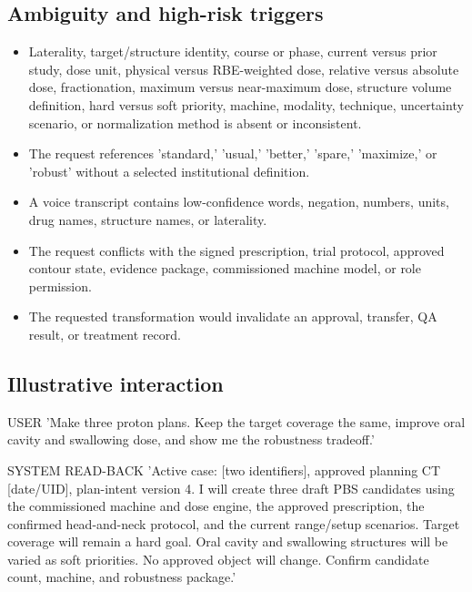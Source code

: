 \documentclass[11pt,letterpaper]{article}
\begin{document}
\subsection{Ambiguity and high-risk triggers}

\begin{itemize}
\item Laterality, target\slash\allowbreak{}structure identity, course or phase, current versus prior study, dose unit, physical versus RBE-weighted dose, relative versus absolute dose, fractionation, maximum versus near-maximum dose, structure volume definition, hard versus soft priority, machine, modality, technique, uncertainty scenario, or normalization method is absent or inconsistent.
\item The request references 'standard,' 'usual,' 'better,' 'spare,' 'maximize,' or 'robust' without a selected institutional definition.
\item A voice transcript contains low-confidence words, negation, numbers, units, drug names, structure names, or laterality.
\item The request conflicts with the signed prescription, trial protocol, approved contour state, evidence package, commissioned machine model, or role permission.
\item The requested transformation would invalidate an approval, transfer, QA result, or treatment record.
\end{itemize}

\subsection{Illustrative interaction}

\begin{nlnotice}{USER}
'Make three proton plans. Keep the target coverage the same, improve oral cavity and swallowing dose, and show me the robustness tradeoff.'
\end{nlnotice}

\begin{nlnotice}{SYSTEM READ-BACK}
'Active case: [two identifiers], approved planning CT [date\slash\allowbreak{}UID], plan-intent version 4. I will create three draft PBS candidates using the commissioned machine and dose engine, the approved prescription, the confirmed head-and-neck protocol, and the current range\slash\allowbreak{}setup scenarios. Target coverage will remain a hard goal. Oral cavity and swallowing structures will be varied as soft priorities. No approved object will change. Confirm candidate count, machine, and robustness package.'
\end{nlnotice}
\end{document}
